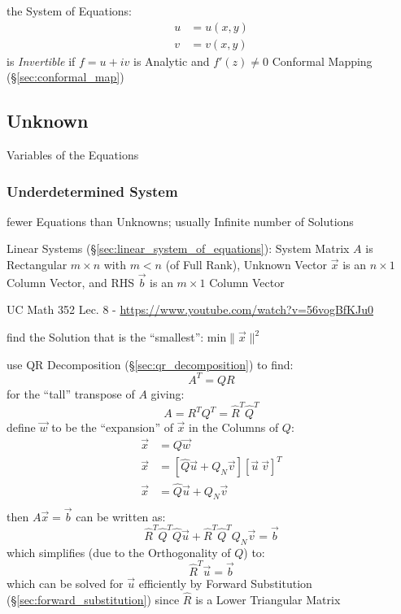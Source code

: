
the System of Equations:
\begin{align*}
  u & = u(x,y) \\
  v & = v(x,y)
\end{align*}
is \emph{Invertible} if $f = u + iv$ is Analytic and $f'(z) \neq 0$ \fist
Conformal Mapping (\S\ref{sec:conformal_map})



\subsection{Unknown}\label{sec:unknown}

Variables of the Equations



\subsubsection{Underdetermined System}\label{sec:underdetermined_system}

fewer Equations than Unknowns; usually Infinite number of Solutions

Linear Systems (\S\ref{sec:linear_system_of_equations}): System Matrix $A$ is
Rectangular $m \times n$ with $m < n$ (of Full Rank), Unknown Vector $\vec{x}$
is an $n \times 1$ Column Vector, and RHS $\vec{b}$ is an $m \times 1$ Column
Vector

UC Math 352 Lec. 8 - \url{https://www.youtube.com/watch?v=56vogBfKJu0}

find the Solution that is the ``smallest'': $\mathrm{min}\|\vec{x}\|^2$

use QR Decomposition (\S\ref{sec:qr_decomposition}) to find:
\[
  A^T = QR
\]
for the ``tall'' transpose of $A$ giving:
\[
  A = R^T Q^T = \hat{R}^T \hat{Q}^T
\]
define $\vec{w}$ to be the ``expansion'' of $\vec{x}$ in the Columns of $Q$:
\begin{align*}
  \vec{x} & = Q\vec{w} \\
  \vec{x} & = [\hat{Q}\vec{u} + Q_N\vec{v}] [\vec{u} \ \vec{v}]^T \\
  \vec{x} & = \hat{Q}\vec{u} + Q_N\vec{v} \\
\end{align*}
then $A\vec{x} = \vec{b}$ can be written as:
\[
  \hat{R}^T\hat{Q}^T\hat{Q}\vec{u} + \hat{R}^T\hat{Q}^TQ_N\vec{v} = \vec{b}
\]
which simplifies (due to the Orthogonality of $Q$) to:
\[
  \hat{R}^T\vec{u} = \vec{b}
\]
which can be solved for $\vec{u}$ efficiently by Forward Substitution
(\S\ref{sec:forward_substitution}) since $\hat{R}$ is a Lower Triangular Matrix

